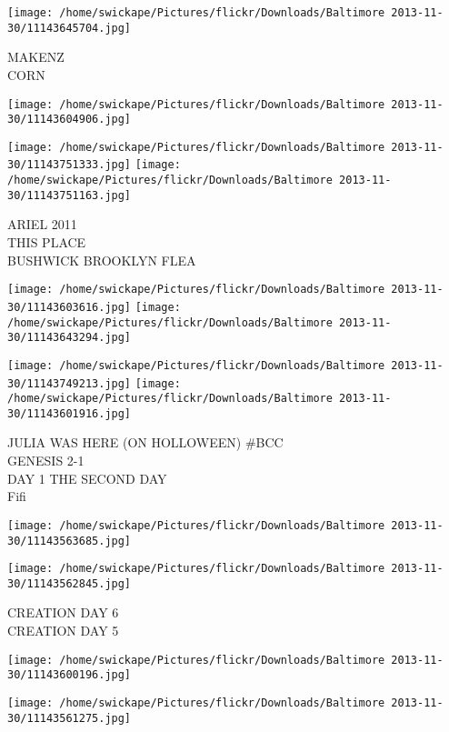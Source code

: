 \documentclass[10pt,letterpaper]{article}
\begin{document}
\vspace{0.25in}
\texttt{[image: /home/swickape/Pictures/flickr/Downloads/Baltimore 2013-11-30/11143645704.jpg]}

MAKENZ\\
CORN
\pagebreak

\texttt{[image: /home/swickape/Pictures/flickr/Downloads/Baltimore 2013-11-30/11143604906.jpg]}

\vspace{0.25in}
\texttt{[image: /home/swickape/Pictures/flickr/Downloads/Baltimore 2013-11-30/11143751333.jpg]}
\texttt{[image: /home/swickape/Pictures/flickr/Downloads/Baltimore 2013-11-30/11143751163.jpg]}

ARIEL 2011\\
THIS PLACE\\
BUSHWICK BROOKLYN FLEA
\pagebreak

\texttt{[image: /home/swickape/Pictures/flickr/Downloads/Baltimore 2013-11-30/11143603616.jpg]}
\texttt{[image: /home/swickape/Pictures/flickr/Downloads/Baltimore 2013-11-30/11143643294.jpg]}

\texttt{[image: /home/swickape/Pictures/flickr/Downloads/Baltimore 2013-11-30/11143749213.jpg]}
\texttt{[image: /home/swickape/Pictures/flickr/Downloads/Baltimore 2013-11-30/11143601916.jpg]}

JULIA WAS HERE (ON HOLLOWEEN) \#BCC\\
GENESIS 2{-}1\\
DAY 1 THE SECOND DAY\\
Fifi
\pagebreak

\texttt{[image: /home/swickape/Pictures/flickr/Downloads/Baltimore 2013-11-30/11143563685.jpg]}

\vspace{0.25in}
\texttt{[image: /home/swickape/Pictures/flickr/Downloads/Baltimore 2013-11-30/11143562845.jpg]}

CREATION DAY 6\\
CREATION DAY 5
\pagebreak

\texttt{[image: /home/swickape/Pictures/flickr/Downloads/Baltimore 2013-11-30/11143600196.jpg]}

\vspace{0.25in}
\texttt{[image: /home/swickape/Pictures/flickr/Downloads/Baltimore 2013-11-30/11143561275.jpg]}
\end{document}
